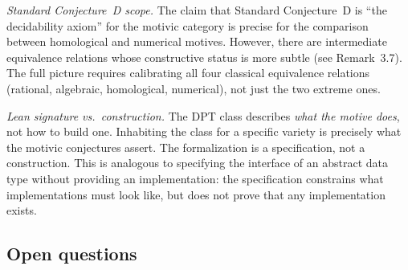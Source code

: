 \documentclass[11pt]{article}
\theoremstyle{definition}
\theoremstyle{remark}
\begin{document}
\emph{Standard Conjecture~D scope.} The claim that Standard Conjecture~D is ``the decidability axiom'' for the motivic category is precise for the comparison between homological and numerical motives. However, there are intermediate equivalence relations whose constructive status is more subtle (see Remark~3.7). The full picture requires calibrating all four classical equivalence relations (rational, algebraic, homological, numerical), not just the two extreme ones.

\emph{Lean signature vs.\ construction.} The DPT class describes \emph{what the motive does}, not how to build one. Inhabiting the class for a specific variety is precisely what the motivic conjectures assert. The formalization is a specification, not a construction. This is analogous to specifying the interface of an abstract data type without providing an implementation: the specification constrains what implementations must look like, but does not prove that any implementation exists.

\subsection{Open questions}
\end{document}

